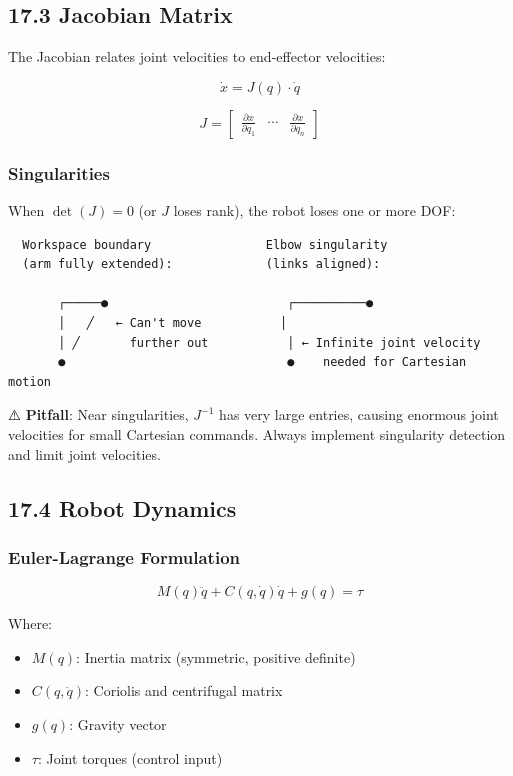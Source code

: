 \documentclass[11pt,a4paper]{book}
\begin{document}
\begin{itemize}
\subsection{17.3 Jacobian Matrix}

The Jacobian relates joint velocities to end-effector velocities:

\[\dot{x} = J(q) \cdot \dot{q}\]

\[J = \begin{bmatrix} \frac{\partial x}{\partial q_1} & \cdots & \frac{\partial x}{\partial q_n} \end{bmatrix}\]

\subsubsection{Singularities}

When $\det(J) = 0$ (or $J$ loses rank), the robot loses one or more DOF:

\begin{lstlisting}
  Workspace boundary                Elbow singularity
  (arm fully extended):             (links aligned):
  
       ┌─────●                         ┌──────────●
       │   ╱   ← Can't move           │
       │ ╱       further out           │ ← Infinite joint velocity
       ●                               ●    needed for Cartesian motion
\end{lstlisting}

⚠️ \textbf{Pitfall}: Near singularities, $J^{-1}$ has very large entries, causing enormous joint velocities for small Cartesian commands. Always implement singularity detection and limit joint velocities.

\medskip\noindent\hrulefill\medskip

\subsection{17.4 Robot Dynamics}

\subsubsection{Euler-Lagrange Formulation}

\[M(q)\ddot{q} + C(q, \dot{q})\dot{q} + g(q) = \tau\]

Where:
\begin{itemize}
\item $M(q)$: Inertia matrix (symmetric, positive definite)
\item $C(q, \dot{q})$: Coriolis and centrifugal matrix
\item $g(q)$: Gravity vector
\item $\tau$: Joint torques (control input)
\end{itemize}


\end{itemize}
\end{document}
